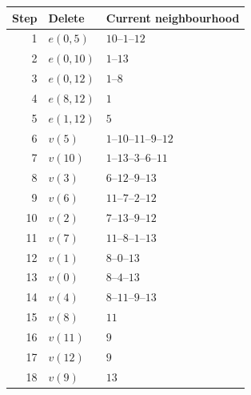 \begin{tabular}{@{}rll@{}}
\toprule
Step & Delete & Current neighbourhood \\
\midrule
1 & $e(0,5)$ & $10\text{--}1\text{--}12$ \\
2 & $e(0,10)$ & $1\text{--}13$ \\
3 & $e(0,12)$ & $1\text{--}8$ \\
4 & $e(8,12)$ & $1$ \\
5 & $e(1,12)$ & $5$ \\
6 & $v(5)$ & $1\text{--}10\text{--}11\text{--}9\text{--}12$ \\
7 & $v(10)$ & $1\text{--}13\text{--}3\text{--}6\text{--}11$ \\
8 & $v(3)$ & $6\text{--}12\text{--}9\text{--}13$ \\
9 & $v(6)$ & $11\text{--}7\text{--}2\text{--}12$ \\
10 & $v(2)$ & $7\text{--}13\text{--}9\text{--}12$ \\
11 & $v(7)$ & $11\text{--}8\text{--}1\text{--}13$ \\
12 & $v(1)$ & $8\text{--}0\text{--}13$ \\
13 & $v(0)$ & $8\text{--}4\text{--}13$ \\
14 & $v(4)$ & $8\text{--}11\text{--}9\text{--}13$ \\
15 & $v(8)$ & $11$ \\
16 & $v(11)$ & $9$ \\
17 & $v(12)$ & $9$ \\
18 & $v(9)$ & $13$ \\
\bottomrule
\end{tabular}
